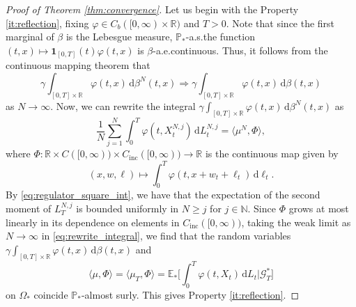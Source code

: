 \documentclass[11pt, a4paper]{article}
\theoremstyle{plain}
\theoremstyle{definition}
\theoremstyle{remark}
\numberwithin{equation}{section}
\newcommand{\ev}{\mathbb{E}}
\newcommand{\pr}{\mathbb{P}}
\newcommand{\R}{\mathbb{R}}
\renewcommand{\d}{\mathrm{d}}
\newcommand{\define}{\mathpunct{:}}
\newcommand{\bb}[1]{\mathbb{#1}}
\renewcommand{\bf}[1]{\mathbf{#1}}
\renewcommand{\cal}[1]{\mathcal{#1}}
\begin{document}
\begin{proof}[Proof of Theorem \ref{thm:convergence}]
Let us begin with the Property \ref{it:reflection}, fixing $\varphi \in C_b([0, \infty) \times \R)$ and $T > 0$. Note that since the first marginal of $\beta$ is the Lebesgue measure, $\pr_{\ast}$-a.s.\@ the function $(t, x) \mapsto \bf{1}_{[0, T]}(t) \varphi(t, x)$ is $\beta$-a.e.\@ continuous. Thus, it follows from the continuous mapping theorem that
\begin{equation*}
    \gamma \int_{[0, T] \times \R} \varphi(t, x) \, \d \beta^N(t,  x) \Rightarrow \gamma \int_{[0, T] \times \R} \varphi(t, x) \, \d \beta(t,  x)
\end{equation*}
as $N \to \infty$. Now, we can rewrite the integral $\gamma \int_{[0, T] \times \R} \varphi(t, x) \, \d \beta^N(t, x)$ as
\begin{equation} \label{eq:rewrite_integral}
    \frac{1}{N} \sum_{j = 1}^N \int_0^T \varphi(t, X^{N, j}_t) \, \d L^{N, j}_t = \langle \mu^N, \Phi\rangle,
\end{equation}
where $\Phi \define \R \times C([0, \infty)) \times C_{\text{inc}}([0, \infty)) \to \R$ is the continuous map given by
\begin{equation*}
    (x, w, \ell) \mapsto \int_0^T \varphi(t, x + w_t + \ell_t) \, \d \ell_t.
\end{equation*}
By \eqref{eq:regulator_square_int}, we have that the expectation of the second moment of $L^{N, j}_T$ is bounded uniformly in $N \geq j$ for $j \in \bb{N}$. Since $\Phi$ grows at most linearly in its dependence on elements in $C_{\text{inc}}([0, \infty))$, taking the weak limit as $N \to \infty$ in \eqref{eq:rewrite_integral}, we find that the random variables $\gamma \int_{[0, T] \times \R} \varphi(t, x) \, \d \beta(t, x)$ and
\begin{equation*}
    \langle \mu, \Phi\rangle = \langle \mu_T, \Phi\rangle = \ev_{\ast}\biggl[\int_0^T \varphi(t, X_t) \, \d L_t \bigg\vert \cal{G}^{\ast}_T\biggr]
\end{equation*}
on $\Omega_{\ast}$ coincide $\pr_{\ast}$-almost surly. This gives Property \ref{it:reflection}.


\end{proof}
\end{document}
